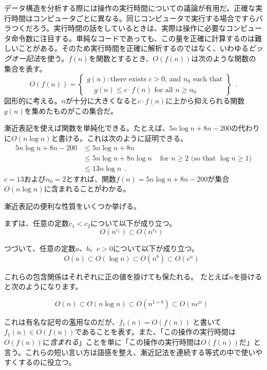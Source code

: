   
データ構造を分析する際には操作の実行時間についての議論が有用だ。正確な実行時間はコンピュータごとに異なる。同じコンピュータで実行する場合ですらバラつくだろう。実行時間の話をしているときは、実際は操作に必要なコンピュータ命令数に注目する。単純なコードであっても、この量を正確に計算するのは難しいことがある。そのため実行時間を正確に解析するのではなく、いわゆる\emph{ビッグオー記法}を使う。$f(n)$を関数とするとき、$O(f(n))$は次のような関数の集合を表す。
\[
   O(f(n)) = \left\{
     \begin{array}{l}
       g(n):\mbox{there exists $c>0$, and $n_0$ such that} \\
             \quad\mbox{$g(n) \le c\cdot f(n)$ for all $n\ge n_0$}
     \end{array} \right\} \enspace .
\]
図形的に考える。$n$が十分に大きくなると$c\cdot f(n)$に上から抑えられる関数$g(n)$を集めたものがこの集合だ。

漸近表記を使えば関数を単純化できる。たとえば、$5n\log n + 8n - 200$の代わりに$O(n \log n)$と書ける。これは次のように証明できる。
\begin{align*} 
       5n\log n + 8n - 200
        & \le 5n\log n + 8n \\
        & \le 5n\log n + 8n\log n & \mbox{ for $n\ge 2$ (so that $\log n \ge 1$)}
            \\
        & \le 13n\log n  \enspace .
\end{align*}
$ c = 13 $および$ n_0 = 2 $とすれば、関数$ f(n)= 5n \log n + 8n-200 $が集合$ O(n \log n)$に含まれることがわかる。

漸近表記の便利な性質をいくつか挙げる。

まずは、任意の定数$c_1 < c_2$について以下が成り立つ。
\[ O(n^{c_1}) \subset O(n^{c_2}) \enspace\]

つづいて、任意の定数$ a、b、c> 0 $について以下が成り立つ。
\[ O(a) \subset O(\log n) \subset O(n^{b}) \subset O({c}^n) \enspace\]

これらの包含関係はそれぞれに正の値を掛けても保たれる。
たとえば$n$を掛けると次のようになります。

\[ O(n) \subset O(n\log n) \subset O(n^{1+b}) \subset O(n{c}^n) \enspace \]

これは有名な記号の濫用なのだが、$f_1(n) = O(f(n))$ と書いて$f_1(n) \in O(f(n))$であることを表す。また、「この操作の実行時間は$O(f(n))$に\emph{含まれる}」ことを単に「この操作の実行時間は$O(f(n))$だ」と言う。これらの短い言い方は語感を整え、漸近記法を連続する等式の中で使いやすくするのに役立つ。


